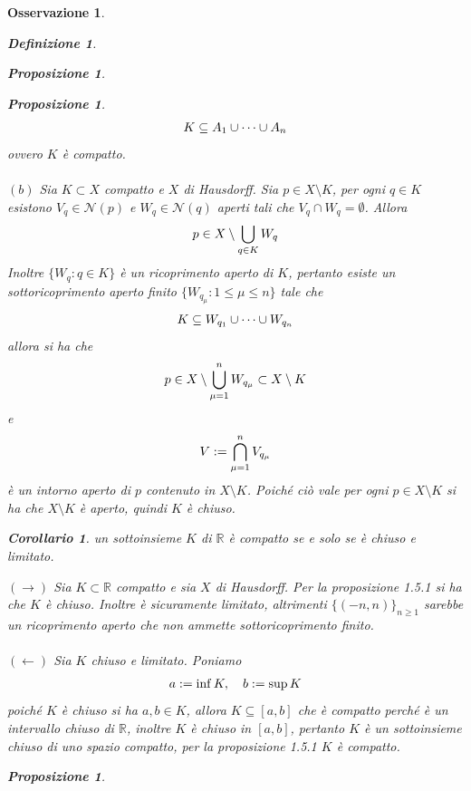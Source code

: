 \documentclass[oneside, 11pt]{amsbook}
\makeatletter
\newcommand{\0}{{(0)}}
\newcommand{\3}{{(3)}}
\theoremstyle{colonplain}
\newtheorem{prop}[thm]{Proposizione}
\newtheorem{cor}[thm]{Corollario}
\theoremstyle{colondefinition}
\newtheorem{defn}[thm]{Definizione}
\theoremstyle{colonremark}
\newtheorem{rmk}[thm]{Osservazione}
\numberwithin{equation}{chapter}
\renewcommand{\proofname}{Dimostrazione}
\renewenvironment{proof}[1][\proofname]{\par
  \pushQED{\end{proof}}%
  \normalfont \topsep6\p@\@plus6\p@\relax
  \trivlist
  \item[\hskip\labelsep\bfseries #1:]\ignorespaces
}{%
  \popQED\endtrivlist\@endpefalse
}
\makeatother
\begin{document}
\begin{rmk}
\begin{defn}
\begin{prop}
\begin{prop}
\begin{proof}
\begin{align}
    K \subseteq A_1 \cup \dots \cup A_n \notag
\end{align}
ovvero $K$ è compatto. \\ \\
$(b)$ Sia $K \subset X$ compatto e $X$ di Hausdorff. Sia $p \in X \setminus K$, per ogni $q \in K$ esistono $V_q \in \mathcal{N}(p)$ e $W_q \in \mathcal{N}(q)$ aperti tali che $V_q \cap W_q = \emptyset$. Allora
\begin{align}
    p \in X \setminus \bigcup_{q \in K} W_q \notag
\end{align}
Inoltre $\{ W_q : q \in K \}$ è un ricoprimento aperto di $K$, pertanto esiste un sottoricoprimento aperto finito $\{ W_{q_\mu} : 1 \leq \mu \leq n \}$ tale che
\begin{align}
    K \subseteq W_{q_1} \cup \dots \cup W_{q_n} \notag
\end{align}
allora si ha che
\begin{align}
    p \in X \setminus \bigcup_{\mu = 1}^n W_{q_\mu} \subset X \setminus K \notag
\end{align}
e
\begin{align}
    V := \bigcap_{\mu = 1}^n V_{q_\mu} \notag
\end{align}
è un intorno aperto di $p$ contenuto in $X \setminus K$. Poiché ciò vale per ogni $p \in X \setminus K$ si ha che $X \setminus K$ è aperto, quindi $K$ è chiuso.
\end{proof}
\begin{cor}
un sottoinsieme $K$ di $\mathbb{R}$ è compatto se e solo se è chiuso e limitato.
\end{cor}
\begin{proof}
$(\rightarrow)$ Sia $K \subset \mathbb{R}$ compatto e sia $X$ di Hausdorff. Per la \textit{proposizione 1.5.1} si ha che $K$ è chiuso. Inoltre è sicuramente limitato, altrimenti $\{ (-n, n) \}_{n \geq 1}$ sarebbe un ricoprimento aperto che non ammette sottoricoprimento finito. \\ \\
$(\leftarrow)$ Sia $K$ chiuso e limitato. Poniamo
\begin{align}
    a := \inf K, \quad b := \sup K \notag
\end{align}
poiché $K$ è chiuso si ha $a, b \in K$, allora $K \subseteq [a, b]$ che è compatto perché è un intervallo chiuso di $\mathbb{R}$, inoltre $K$ è chiuso in $[a, b]$, pertanto $K$ è un sottoinsieme chiuso di uno spazio compatto, per la \textit{proposizione 1.5.1} $K$ è compatto.
\end{proof}
\begin{prop}

\end{prop}
\end{prop}
\end{prop}
\end{defn}
\end{rmk}
\end{document}
